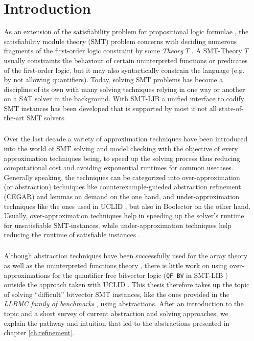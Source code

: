 \chapter{Introduction}
\label{ch:introduction}
As an extension of the satisfiability problem for propositional logic formulae \cite{Marques-Silva-PropositionalSATSolving}, the satisfiability module theory (SMT) problem concerns with deciding numerous fragments of the first-order logic constraint by some \textit{Theory} $T$ \cite{Barrett-Tinelli-SMT}.
A SMT-Theory $T$ usually constraints the behaviour of certain uninterpreted functions or predicates of the first-order logic, but it may also syntactically constrain the language (e.g. by not allowing quantifiers).
Today, solving SMT problems has become a discipline of its own with many solving techniques relying in one way or another on a SAT solver in the background.
With SMT-LIB \cite{BarFT-SMTLIB} a unified interface to codify SMT instances has been developed that is supported by most if not all state-of-the-art SMT solvers.
\paragraph{}
Over the last decade a variety of approximation techniques have been introduced into the world of SMT solving and model checking with the objective of every approximation techniques being, to speed up the solving process thus reducing computational cost and avoiding exponential runtimes for common usecases.
Generally speaking, the techniques can be categorized into over-approximation (or abstraction) techniques like counterexample-guieded abstraction refinement (CEGAR) \cite{CEGAR} and lemmas on demand \cite{p6-brummayer} on the one hand, and under-approximation techniques like the ones used in UCLID \cite{Bryant2007_Chapter_DecidingBit-VectorArithmeticWi-UCLID}, but also in Boolector \cite{NiemetzPreinerBiere-JSAT15} on the other hand.
Usually, over-approximation techniques help in speeding up the solver's runtime for unsatisfiable SMT-instances, while under-approximation techniques help reducing the runtime of satisfiable instances \cite{Brummayer-PhD}. 
\paragraph{}
Although abstraction techniques have been successfully used for the array theory \cite{p6-brummayer} as well as the uninterpreted functions theory \cite{PreinerNiemetzBiere-DIFTS13,NiemetzPreinerBiere-FMCAD14}, there is little work on using over-approximations for the quantifier free bitvector logic (\texttt{QF\_BV} in SMT-LIB \cite{BarFT-SMTLIB}) outside the approach taken with UCLID \cite{Bryant2007_Chapter_DecidingBit-VectorArithmeticWi-UCLID}.
This thesis therefore takes up the topic of solving \enquote{difficult} bitvector SMT instances, like the ones provided in the \textit{LLBMC family of benchmarks} \cite{sc2017-proceedings}, using abstractions.
After an introduction to the topic and a short survey of current abstraction and solving approaches, we explain the pathway and intuition that led to the abstractions presented in chapter \ref{ch:refinement}.

